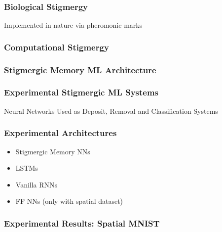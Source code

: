 \documentclass{beamer}
\begin{document}
\begin{frame}
    \frametitle{Biological Stigmergy}
    \begin{center}
        Implemented in nature via pheromonic marks 
    \end{center}
    \pause
    
\end{frame}

\begin{frame}
    \frametitle{Computational Stigmergy}
    
\end{frame}

\begin{frame}
    \frametitle{Stigmergic Memory ML Architecture}
    
\end{frame}

\begin{frame}
    \frametitle{Experimental Stigmergic ML Systems}
    Neural Networks Used as Deposit, Removal and Classification Systems
    \vspace{1.5cm}
    
\end{frame}

\begin{frame}
    \frametitle{Experimental Architectures}
    \begin{itemize}
        \item Stigmergic Memory NNs
        \item LSTMs
        \item Vanilla RNNs
        \item FF NNs (only with spatial dataset)
    \end{itemize}
\end{frame}



\begin{frame}
    \frametitle{Experimental Results: Spatial MNIST}
    
\end{frame}
\end{document}

